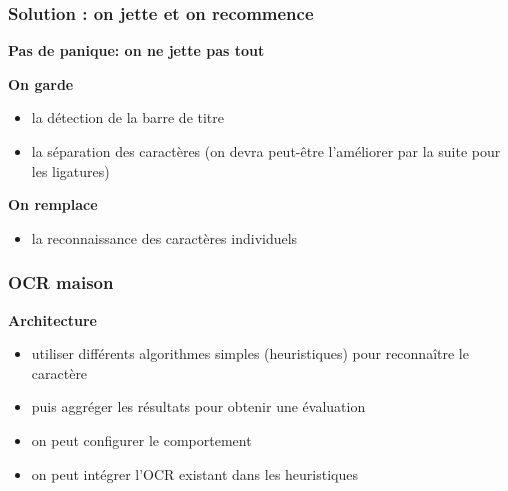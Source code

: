 \documentclass[xcolor=dvipsnames]{beamer}
\begin{document}
\begin{frame}
\frametitle{Solution : on jette et on recommence}
    \pause
    \begin{center}\begin{alertblock}{}
            \begin{center}\textbf{\Large Pas de panique: on ne jette pas tout}\end{center}\pause
    \end{alertblock}\end{center}
    \begin{center}\begin{alertblock}{}
            \begin{center}\textbf{\Large On garde}\end{center}\pause
    \end{alertblock}\end{center}
    \begin{itemize}
    \item la détection de la barre de titre\pause
    \item la séparation des caractères (on devra peut-être l'améliorer par la suite pour les ligatures)\pause
    \end{itemize}
    \begin{center}\begin{alertblock}{}
            \begin{center}\textbf{\Large On remplace}\end{center}\pause
    \end{alertblock}\end{center}
    \begin{itemize}
    \item la reconnaissance des caractères individuels
    \end{itemize}
\end{frame}


\begin{frame}
\frametitle{OCR maison}
    \begin{center}\begin{alertblock}{}
            \textbf{\Large Architecture}\pause
    \end{alertblock}\end{center}
    \begin{itemize}
            \item utiliser différents algorithmes simples (heuristiques) pour reconnaître le caractère\pause
            \item puis aggréger les résultats pour obtenir une évaluation\pause
            \item on peut configurer le comportement\pause
            \item on peut intégrer l'OCR existant dans les heuristiques
    \end{itemize}
\end{frame}
\end{document}
